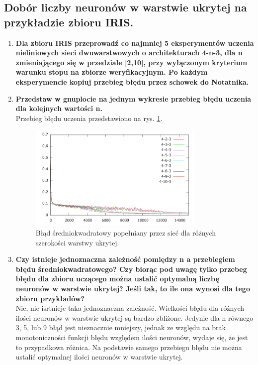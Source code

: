 \subsection{Dobór liczby neuronów w warstwie ukrytej na przykładzie zbioru IRIS.}
\begin{enumerate}
\item \textbf{ Dla zbioru IRIS przeprowadź co najmniej 5 eksperymentów uczenia nieliniowych sieci dwuwarstwowych o architekturach 4-n-3, dla n zmieniającego się w przedziale [2,10], przy wyłączonym kryterium warunku stopu na zbiorze weryfikacyjnym. Po każdym eksperymencie kopiuj przebieg błędu przez schowek do Notatnika.}

\item \textbf{
Przedstaw w gnuplocie na jednym wykresie przebieg błędu uczenia dla kolejnych wartości n.}
\\Przebieg błędu uczenia przedstawiono na rys. \ref{fig:errors4n3}.
\begin{figure}[h]
\centering
\includegraphics[width=0.8\textwidth]{dane/part1/zad4/errors4n3}
\caption{Błąd średniokwadratowy popełniany przez sieć dla różnych szerokości warstwy ukrytej.\label{fig:errors4n3}}
\end{figure}

\item \textbf{
Czy istnieje jednoznaczna zależność pomiędzy n a przebiegiem błędu średniokwadratowego? Czy biorąc pod uwagę tylko przebeg błędu dla zbioru uczącego można ustalić optymalną liczbę neuronów w warstwie ukrytej? Jeśli tak, to ile ona wynosi dla tego zbioru przykładów?}
\\Nie, nie isrtnieje taka jednoznaczna zależność. Wielkości błędu dla różnych ilości neuronów w warstwie ukrytej są bardzo zbliżone. Jedynie dla n równego 3, 5, lub 9 błąd jest nieznacznie mniejszy, jednak ze względu na brak monotoniczności funkcji błędu względem ilości neuronów, wydaje się, że jest to przypadkowa różnica. Na podstawie samego przebiegu błędu nie można ustalić optymalnej ilości neuronów w warstwie ukrytej.
\end{enumerate}


